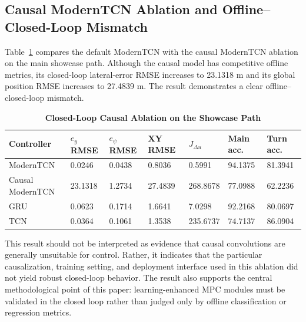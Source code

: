 \documentclass{ieeeaccess}
\begin{document}
\subsection{Causal ModernTCN Ablation and Offline--Closed-Loop Mismatch}

Table~\ref{tab:causal_closed_loop} compares the default ModernTCN with the causal ModernTCN ablation on the main showcase path. Although the causal model has competitive offline metrics, its closed-loop lateral-error RMSE increases to 23.1318 m and its global position RMSE increases to 27.4839 m. The result demonstrates a clear offline--closed-loop mismatch.

\begin{table}[!t]

\caption{\textbf{Closed-Loop Causal Ablation on the Showcase Path}}

\label{tab:causal_closed_loop}

\setlength{\tabcolsep}{4pt}

\begin{tabular}{|p{105pt}|p{48pt}|p{48pt}|p{48pt}|p{55pt}|p{48pt}|p{48pt}|}

\hline

Controller & $e_y$ RMSE & $e_{\psi}$ RMSE & XY RMSE & $J_{\Delta u}$ & Main acc. & Turn acc. \\

\hline

ModernTCN & 0.0246 & 0.0438 & 0.8036 & 0.5991 & 94.1375 & 81.3941 \\

Causal ModernTCN & 23.1318 & 1.2734 & 27.4839 & 268.8678 & 77.0988 & 62.2236 \\

GRU & 0.0623 & 0.1714 & 1.6641 & 7.0298 & 92.2168 & 80.0697 \\

TCN & 0.0364 & 0.1061 & 1.3538 & 235.6737 & 74.7137 & 86.0904 \\

\hline

\end{tabular}

\end{table}

This result should not be interpreted as evidence that causal convolutions are generally unsuitable for control. Rather, it indicates that the particular causalization, training setting, and deployment interface used in this ablation did not yield robust closed-loop behavior. The result also supports the central methodological point of this paper: learning-enhanced MPC modules must be validated in the closed loop rather than judged only by offline classification or regression metrics.
\end{document}
